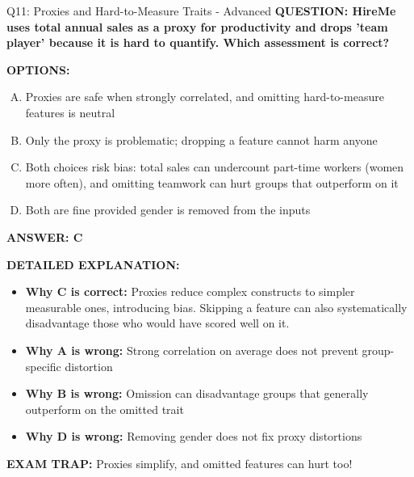 \documentclass[8pt]{beamer}
\begin{document}
\begin{frame}[shrink=6]{Q11: Proxies and Hard-to-Measure Traits - Advanced}
\fontsize{6.5}{7.5}\selectfont
\textbf{QUESTION: HireMe uses total annual sales as a proxy for productivity and drops 'team player' because it is hard to quantify. Which assessment is correct?}

\vspace{0.1cm}
\textbf{OPTIONS:}
\begin{enumerate}[A.]
\item Proxies are safe when strongly correlated, and omitting hard-to-measure features is neutral
\item Only the proxy is problematic; dropping a feature cannot harm anyone
\item Both choices risk bias: total sales can undercount part-time workers (women more often), and omitting teamwork can hurt groups that outperform on it
\item Both are fine provided gender is removed from the inputs
\end{enumerate}

\vspace{0.1cm}
\textcolor{myblue}{\textbf{ANSWER: C}}

\vspace{0.1cm}
\textbf{DETAILED EXPLANATION:}
\begin{itemize}
\item \textbf{Why C is correct:} Proxies reduce complex constructs to simpler measurable ones, introducing bias. Skipping a feature can also systematically disadvantage those who would have scored well on it.
\item \textbf{Why A is wrong:} Strong correlation on average does not prevent group-specific distortion
\item \textbf{Why B is wrong:} Omission can disadvantage groups that generally outperform on the omitted trait
\item \textbf{Why D is wrong:} Removing gender does not fix proxy distortions
\end{itemize}

\textcolor{myred}{\textbf{EXAM TRAP:}} Proxies simplify, and omitted features can hurt too!
\end{frame}
\end{document}
